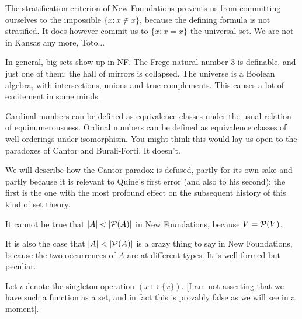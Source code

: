 \documentclass[12pt]{slides}
\begin{document}
\begin{slide}

The stratification criterion of New Foundations prevents us from committing ourselves to the impossible $\{x:x \not\in x\}$, because the defining formula is not stratified.  It does however commit us to $\{x:x=x\}$ the universal set.  We are not in Kansas any more, Toto...

In general, big sets show up in NF.  The Frege natural number 3 is definable, and just one of them:  the hall of mirrors is collapsed.  The universe is a Boolean algebra, with intersections, unions and true complements.  This causes a lot of excitement in some minds.

Cardinal numbers can be defined as equivalence classes under the usual relation of equinumerousness.  Ordinal numbers can be defined as equivalence classes of well-orderings under isomorphism.  You might think this would lay us open to the paradoxes of Cantor and Burali-Forti.  It doesn't.


\end{slide}

\begin{slide}

We will describe how the Cantor paradox is defused, partly for its own sake and partly because it is relevant to Quine's first error (and also to his second); the first is the one with the most profound effect on the subsequent history of this kind of set theory.

It cannot be true that $|A| < |{\cal P}(A)|$ in New Foundations, because $V = {\cal P}(V)$.

It is also the case that $|A| < |{\cal P}(A)|$ is a crazy thing to say in New Foundations, because the two occurrences of $A$ are at different types.  It is well-formed but peculiar.

Let $\iota$ denote the singleton operation $(x \mapsto \{x\})$.  [I am not asserting that we have such a function as a set, and in fact this is provably false as we will see in a moment].

\end{slide}
\end{document}
